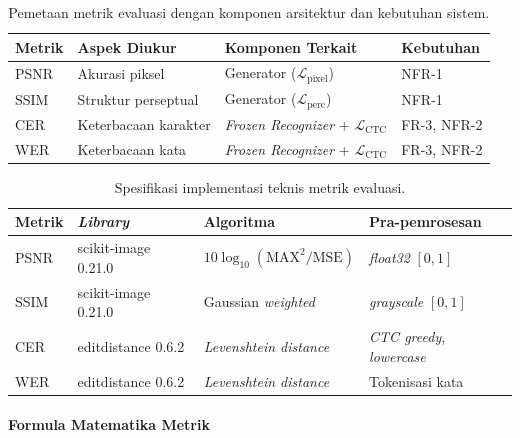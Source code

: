 \begin{table}[H]
  \caption[Pemetaan metrik evaluasi dengan komponen arsitektur]{Pemetaan metrik evaluasi dengan komponen arsitektur dan kebutuhan sistem.}
  \label{tab:metric-component-mapping}
  \small

  \begin{tabularx}{\textwidth}{|l|X|X|l|}
    \hline
    \textbf{Metrik} & \textbf{Aspek Diukur} & \textbf{Komponen Terkait}                      & \textbf{Kebutuhan} \\
    \hline
    PSNR            & Akurasi piksel        & Generator ($\mathcal{L}_{\text{pixel}}$)       & NFR-1              \\
    SSIM            & Struktur perseptual   & Generator ($\mathcal{L}_{\text{perc}}$)        & NFR-1              \\
    CER             & Keterbacaan karakter  & \textit{Frozen Recognizer} + $\mathcal{L}_{\text{CTC}}$ & FR-3, NFR-2        \\
    WER             & Keterbacaan kata      & \textit{Frozen Recognizer} + $\mathcal{L}_{\text{CTC}}$ & FR-3, NFR-2        \\
    \hline
  \end{tabularx}
\end{table}

\begin{table}[H]
  \caption[Spesifikasi implementasi metrik evaluasi]{Spesifikasi implementasi teknis metrik evaluasi.}
  \label{tab:metric-implementation}
  \small

  \begin{tabularx}{\textwidth}{|l|l|X|X|}
    \hline
    \textbf{Metrik} & \textbf{\textit{Library}} & \textbf{Algoritma} & \textbf{Pra-pemrosesan} \\
    \hline
    PSNR & scikit-image 0.21.0 & $10\log_{10}(\text{MAX}^2/\text{MSE})$ & \textit{float32} $[0,1]$ \\
    SSIM & scikit-image 0.21.0 & Gaussian \textit{weighted} & \textit{grayscale} $[0,1]$ \\
    CER  & editdistance 0.6.2  & \textit{Levenshtein distance} & \textit{CTC greedy}, \textit{lowercase} \\
    WER  & editdistance 0.6.2  & \textit{Levenshtein distance} & Tokenisasi kata \\
    \hline
  \end{tabularx}
\end{table}

\paragraph{Formula Matematika Metrik}

